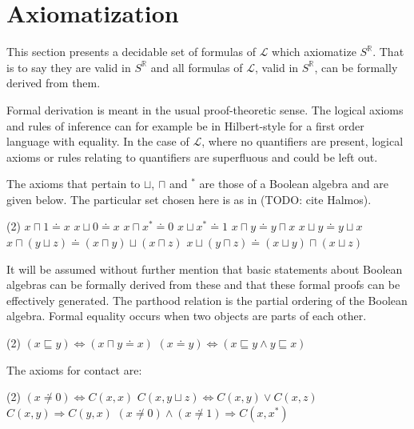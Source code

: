 \documentclass{article}
\newcommand{\R}{\mathbb{R}}
\newcommand{\lang}{\mathcal{L}}
\newcommand{\lcup}{\sqcup}
\newcommand{\lcap}{\sqcap}
\newcommand{\lstar}{^*}
\newcommand{\lpart}{\sqsubseteq}
\newcommand{\lparteq}{\doteq}
\newcommand{\lcont}{C}
\begin{document}
\section{Axiomatization}
This section presents a decidable set of formulas of $\lang$ which axiomatize $S^\R$. That is to say they are valid in $S^\R$ and all formulas of $\lang$, valid in $S^\R$, can be formally derived from them.

Formal derivation is meant in the usual proof-theoretic sense. The logical axioms and rules of inference can for example be in Hilbert-style for a first order language with equality. In the case of $\lang$, where no quantifiers are present, logical axioms or rules relating to quantifiers are superfluous and could be left out.

The axioms that pertain to $\lcup$, $\lcap$ and $\lstar$ are those of a Boolean algebra and are given below. The particular set chosen here is as in (TODO: cite Halmos).
\begin{tasks}(2)
\task[] $x \lcap 1 \lparteq x$
\task[] $x \lcup 0 \lparteq x$
\task[] $x \lcap x\lstar \lparteq 0$
\task[] $x \lcup x\lstar \lparteq 1$
\task[] $x \lcap y \lparteq y \lcap x$
\task[] $x \lcup y \lparteq y \lcup x$
\task[] $x \lcap (y \lcup z) \lparteq (x \lcap y) \lcup (x \lcap z)$
\task[] $x \lcup (y \lcap z) \lparteq (x \lcup y) \lcap (x \lcup z)$
\end{tasks}
It will be assumed without further mention that basic statements about Boolean algebras can be formally derived from these and that these formal proofs can be effectively generated. The parthood relation is the partial ordering of the Boolean algebra. Formal equality occurs when two objects are parts of each other.
\begin{tasks}(2)
  \task[] $(x \lpart y) \Leftrightarrow (x \lcap y \lparteq x)$
  \task[] $(x \lparteq y) \Leftrightarrow (x \lpart y \land y \lpart x)$
\end{tasks}

The axioms for contact are:
\begin{tasks}(2)
  \task[] $(x \not \lparteq 0) \Leftrightarrow \lcont(x, x)$
  \task[] $\lcont(x, y \lcup z) \Leftrightarrow \lcont(x, y) \lor \lcont(x, z)$
  \task[] $\lcont(x, y) \Rightarrow \lcont(y, x)$
  \task[] $(x \not \lparteq 0) \land (x \not \lparteq 1) \Rightarrow \lcont(x, x\lstar)$
\end{tasks}
\end{document}
